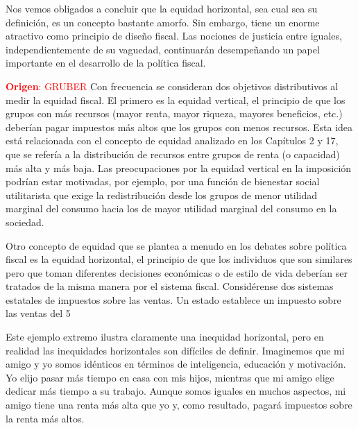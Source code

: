 \documentclass[10pt,a4paper]{article}
\begin{document}
Nos vemos obligados a concluir que la equidad horizontal, sea cual sea su definición, es un concepto bastante amorfo. Sin embargo, tiene un enorme atractivo como principio de diseño fiscal. Las nociones de justicia entre iguales, independientemente de su vaguedad, continuarán desempeñando un papel importante en el desarrollo de la política fiscal.


\textcolor{red}{\textbf{Origen}: GRUBER}
Con frecuencia se consideran dos objetivos distributivos al medir la equidad fiscal. El primero es la equidad vertical, el principio de que los grupos con más recursos (mayor renta, mayor riqueza, mayores beneficios, etc.) deberían pagar impuestos más altos que los grupos con menos recursos. Esta idea está relacionada con el concepto de equidad analizado en los Capítulos 2 y 17, que se refería a la distribución de recursos entre grupos de renta (o capacidad) más alta y más baja. Las preocupaciones por la equidad vertical en la imposición podrían estar motivadas, por ejemplo, por una función de bienestar social utilitarista que exige la redistribución desde los grupos de menor utilidad marginal del consumo hacia los de mayor utilidad marginal del consumo en la sociedad.

Otro concepto de equidad que se plantea a menudo en los debates sobre política fiscal es la equidad horizontal, el principio de que los individuos que son similares pero que toman diferentes decisiones económicas o de estilo de vida deberían ser tratados de la misma manera por el sistema fiscal. Considérense dos sistemas estatales de impuestos sobre las ventas. Un estado establece un impuesto sobre las ventas del 5 %

Este ejemplo extremo ilustra claramente una inequidad horizontal, pero en realidad las inequidades horizontales son difíciles de definir. Imaginemos que mi amigo y yo somos idénticos en términos de inteligencia, educación y motivación. Yo elijo pasar más tiempo en casa con mis hijos, mientras que mi amigo elige dedicar más tiempo a su trabajo. Aunque somos iguales en muchos aspectos, mi amigo tiene una renta más alta que yo y, como resultado, pagará impuestos sobre la renta más altos.
\end{document}
